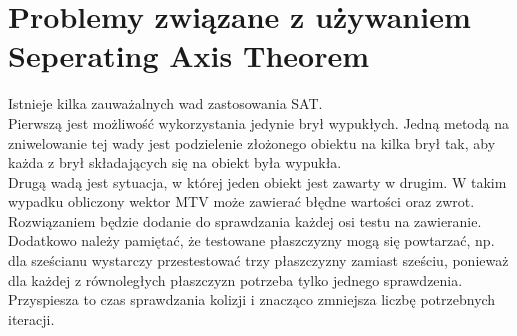 \section{Problemy związane z używaniem Seperating Axis Theorem}
Istnieje kilka zauważalnych wad zastosowania SAT. \\
Pierwszą jest możliwość wykorzystania jedynie brył wypukłych. Jedną metodą na zniwelowanie tej wady jest podzielenie złożonego obiektu na kilka brył tak, aby każda z brył składających się na obiekt była wypukła.\\
Drugą wadą jest sytuacja, w której jeden obiekt jest zawarty w drugim. W takim wypadku obliczony wektor MTV może zawierać błędne wartości oraz zwrot. Rozwiązaniem będzie dodanie do sprawdzania każdej osi testu na zawieranie. \\
Dodatkowo należy pamiętać, że testowane płaszczyzny mogą się powtarzać, np. dla sześcianu wystarczy przestestować trzy płaszczyzny zamiast sześciu, ponieważ dla każdej z równoległych płaszczyzn potrzeba tylko jednego sprawdzenia. Przyspiesza to czas sprawdzania kolizji i znacząco zmniejsza liczbę potrzebnych iteracji.